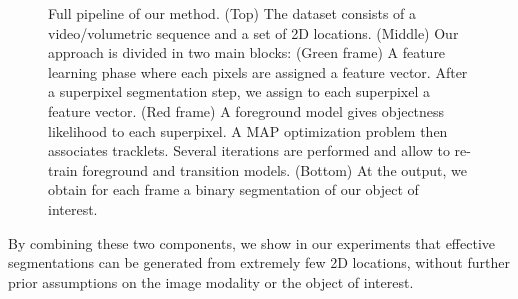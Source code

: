 \begin{figure}[!ht]
  \centering
{}
\caption{Full pipeline of our method.
  (Top) The dataset consists of a video/volumetric sequence and a set of 2D locations. (Middle) Our approach is divided in two main blocks: (Green frame) A feature learning phase where each pixels are assigned a feature vector. After a superpixel segmentation step, we assign to each superpixel a feature vector. (Red frame) A foreground model gives objectness likelihood to each superpixel. A MAP optimization problem then associates tracklets. Several iterations are performed and allow to re-train foreground and transition models. (Bottom) At the output, we obtain for each frame a binary segmentation of our object of interest.}
\label{fig:pipeline}
\end{figure}

By combining these two components, we show in our experiments that effective segmentations can be generated from extremely few 2D locations, without further prior assumptions on the image modality or the object of interest. 

